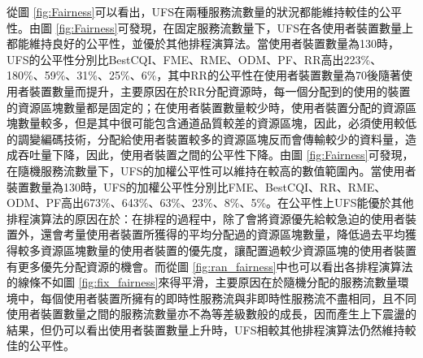 從圖 \ref{fig:Fairness}可以看出，UFS在兩種服務流數量的狀況都能維持較佳的公平性。由圖 \ref{fig:Fairness}可發現，在固定服務流數量下，UFS在各使用者裝置數量上都能維持良好的公平性，並優於其他排程演算法。當使用者裝置數量為130時，UFS的公平性分別比BestCQI、FME、RME、ODM、PF、RR高出223\%、180\%、59\%、31\%、25\%、6\%，其中RR的公平性在使用者裝置數量為70後隨著使用者裝置數量而提升，主要原因在於RR分配資源時，每一個分配到的使用的裝置的資源區塊數量都是固定的；在使用者裝置數量較少時，使用者裝置分配的資源區塊數量較多，但是其中很可能包含通道品質較差的資源區塊，因此，必須使用較低的調變編碼技術，分配給使用者裝置較多的資源區塊反而會傳輸較少的資料量，造成吞吐量下降，因此，使用者裝置之間的公平性下降。由圖 \ref{fig:Fairness}可發現，在隨機服務流數量下，UFS的加權公平性可以維持在較高的數值範圍內。當使用者裝置數量為130時，UFS的加權公平性分別比FME、BestCQI、RR、RME、ODM、PF高出673\%、643\%、63\%、23\%、8\%、5\%。在公平性上UFS能優於其他排程演算法的原因在於：在排程的過程中，除了會將資源優先給較急迫的使用者裝置外，還會考量使用者裝置所獲得的平均分配過的資源區塊數量，降低過去平均獲得較多資源區塊數量的使用者裝置的優先度，讓配置過較少資源區塊的使用者裝置有更多優先分配資源的機會。而從圖 \ref{fig:ran_fairness}中也可以看出各排程演算法的線條不如圖 \ref{fig:fix_fairness}來得平滑，主要原因在於隨機分配的服務流數量環境中，每個使用者裝置所擁有的即時性服務流與非即時性服務流不盡相同，且不同使用者裝置數量之間的服務流數量亦不為等差級數般的成長，因而產生上下震盪的結果，但仍可以看出使用者裝置數量上升時，UFS相較其他排程演算法仍然維持較佳的公平性。

